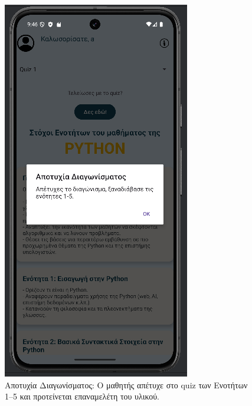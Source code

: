 \documentclass[11pt]{report}
\begin{document}
\begin{figure}[H]
  \centering
  \includegraphics[width=\linewidth, height=0.35\textheight, keepaspectratio]{Figures/εικόνα (14).png}
  \caption{Αποτυχία Διαγωνίσματος: Ο μαθητής απέτυχε στο quiz των Ενοτήτων 1–5 και προτείνεται επαναμελέτη του υλικού.}
\end{figure}
\end{document}
